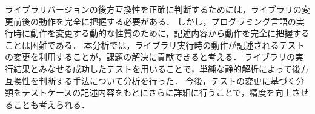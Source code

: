 \documentclass[submit]{ipsj}
\begin{document}
ライブラリバージョンの後方互換性を正確に判断するためには，ライブラリの変更前後の動作を完全に把握する必要がある．
しかし，プログラミング言語の実行時に動作を変更する動的な性質のために，記述内容から動作を完全に把握することは困難である．
本分析では，ライブラリ実行時の動作が記述されるテストの変更を利用することが，課題の解決に貢献できると考える．
ライブラリの実行結果とみなせる成功したテストを用いることで，単純な静的解析によって後方互換性を判断する手法について分析を行った．
今後，テストの変更に基づく分類をテストケースの記述内容をもとにさらに詳細に行うことで，精度を向上させることも考えられる．





\begin{biography}
%
\end{biography}
\end{document}
